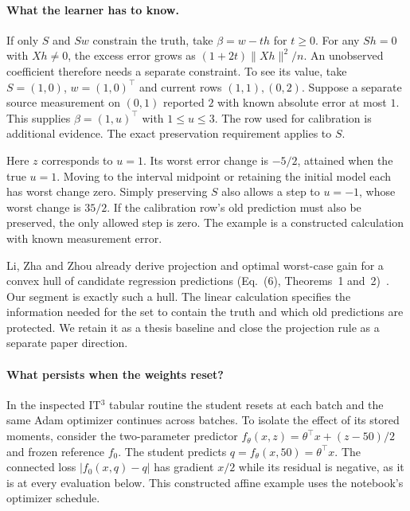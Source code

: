 \documentclass[11pt,a4paper]{article}
\begin{document}
\paragraph{What the learner has to know.}
If only $S$ and $Sw$ constrain the truth, take $\beta=w-th$ for $t\ge0$.
For any $Sh=0$ with $Xh\ne0$, the excess error grows as
$(1+2t)\|Xh\|^2/n$. An unobserved coefficient therefore needs a separate
constraint. To see its value, take $S=(1,0)$, $w=(1,0)^\top$ and current
rows $(1,1),(0,2)$. Suppose a separate source measurement on $(0,1)$
reported $2$ with known absolute error at most $1$. This supplies
$\beta=(1,u)^\top$ with $1\le u\le3$. The row used for calibration is
additional evidence. The exact preservation requirement applies to $S$.

Here $z$ corresponds to $u=1$. Its worst error change is $-5/2$, attained
when the true $u=1$. Moving to the interval midpoint or retaining the
initial model each has worst change zero. Simply preserving $S$ also
allows a step to $u=-1$, whose worst change is $35/2$. If the calibration
row's old prediction must also be preserved, the only allowed step is zero.
The example is a constructed calculation with known measurement error.

Li, Zha and Zhou already derive projection and optimal worst-case gain for
a convex hull of candidate regression predictions (Eq.~(6), Theorems~1
and~2)~\cite{safer}. Our segment is exactly such a hull. The linear
calculation specifies the information needed for the set to contain the
truth and which old predictions are protected. We retain it as a thesis
baseline and close the projection rule as a separate paper direction.

\paragraph{What persists when the weights reset?}
In the inspected IT$^3$ tabular routine the student resets at each batch
and the same Adam optimizer continues across batches. To isolate the
effect of its stored moments, consider the two-parameter predictor
$f_\theta(x,z)=\theta^\top x+(z-50)/2$ and frozen reference $f_0$.
The student predicts $q=f_\theta(x,50)=\theta^\top x$. The connected
loss $|f_0(x,q)-q|$ has gradient $x/2$ while its residual is negative,
as it is at every evaluation below. This constructed affine example
uses the notebook's optimizer schedule.
\end{document}
